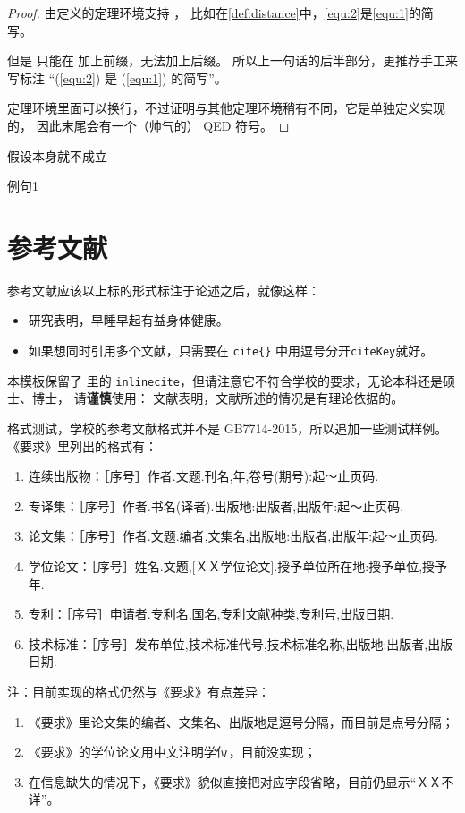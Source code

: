 \begin{proof}
由定义的定理环境支持 ，
比如在\autoref{def:distance}中，\autoref{equ:2}是\autoref{equ:1}的简写。

但是  只能在  加上前缀，无法加上后缀。
所以上一句话的后半部分，更推荐手工来写标注 “(\ref{equ:2}) 是 (\ref{equ:1}) 的简写”。

定理环境里面可以换行，不过证明与其他定理环境稍有不同，它是单独定义实现的，
因此末尾会有一个（帅气的） QED 符号。
\end{proof}

\begin{assumption}
\label{assume:fail}
假设本身就不成立
\end{assumption}

\begin{lines}
\label{s1}
例句1
\end{lines}

\section{参考文献}
\label{sec:bib}
参考文献应该以上标的形式标注于论述之后，就像这样：

\begin{itemize}
\item 研究表明\cite{r1}，早睡早起有益身体健康。
\item 如果想同时引用多个文献\cite{r2,r3,r4,r6}，只需要在 \verb|cite{}| 中用逗号分开\texttt{citeKey}就好。
\end{itemize}

本模板保留了 \cquthesis{} 里的 \texttt{inlinecite}，但请注意它不符合学校的要求，无论本科还是硕士、博士，
请\textbf{谨慎}使用：
文献表明，文献所述的情况是有理论依据的。

\nuaathesis 格式测试，学校的参考文献格式并不是 GB7714-2015，所以追加一些测试样例。
《要求》里列出的格式有：
\begin{enumerate}
  \item 连续出版物\cite{n11,n12}：［序号］作者.文题.刊名,年,卷号(期号):起～止页码.
  \item 专译集\cite{n21,n22}：［序号］作者.书名(译者).出版地:出版者,出版年:起～止页码.
  \item 论文集\cite{n31,n32}：［序号］作者.文题.编者,文集名,出版地:出版者,出版年:起～止页码.
  \item 学位论文\cite{n41,n42,n43}：［序号］姓名.文题,[ＸＸ学位论文].授予单位所在地:授予单位,授予年.
  \item 专利\cite{n51,n52,n53}：［序号］申请者.专利名,国名,专利文献种类,专利号,出版日期.
  \item 技术标准\cite{n61,n62,n63}：［序号］发布单位,技术标准代号,技术标准名称,出版地:出版者,出版日期.
\end{enumerate}

注：目前实现的格式仍然与《要求》有点差异：
\begin{enumerate}
  \item 《要求》里论文集的编者、文集名、出版地是逗号分隔，而目前是点号分隔；
  \item 《要求》的学位论文用中文注明学位，目前没实现；
  \item 在信息缺失的情况下，《要求》貌似直接把对应字段省略，目前仍显示“ＸＸ不详”。
\end{enumerate}
